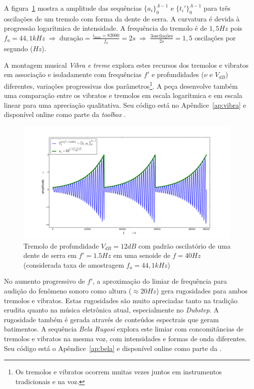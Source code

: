 A figura~\ref{fig:tremolo} mostra a amplitude das sequências $\{a_i\}_0^{\Lambda-1}$ e $\{t_i'\}_0^{\Lambda-1}$
para três oscilações de um tremolo com forma da dente de serra. A curvatura é devida à progressão logarítmica de
intensidade. A frequência do tremolo é de $1,5Hz$ pois $f_a=44,1kHz \; \Rightarrow \; \text{duração} = \frac{i_{\text{máx}}=82000}{f_a}= 2s \; \Rightarrow \; \frac{3\text{oscilações}}{2s}=1,5$ oscilações por segundo ($Hz$). 

A montagem musical \emph{Vibra e treme} explora estes recursos dos tremolos e vibratos em associação e isoladamente
com frequências $f'$
e profundidades ($\nu$ e $V_{dB}$) diferentes, variações progressivas dos parâmetros\footnote{Os tremolos e vibratos ocorrem muitas vezes juntos em instrumentos tradicionais e na voz.}. A peça desenvolve também uma comparação entre os vibratos e tremolos em escala logarítmica e em escala linear para uma apreciação qualitativa. Seu código está no Apêndice~\ref{ap:vibra} e disponível online como parte da \emph{toolbox} \massa.


\begin{figure}[h!]
    \centering
        \includegraphics[width=\textwidth]{figuras/tremolo}
    \caption{Tremolo de profundidade $V_{dB}=12dB$ com padrão oscilatório de uma dente de serra em $f'=1.5Hz$ em uma senoide de $f=40Hz$ (considerada taxa de amostragem $f_a=44,1kHz$)}
        \label{fig:tremolo}
\end{figure}

No aumento progressivo de $f'$,
a aproximação do limiar de frequência
para audição do fenômeno sonoro como
altura ($\approx 20Hz$) gera rugosidades para
ambos tremolos e vibratos. Estas rugosidades são muito apreciadas
tanto na tradição erudita quanto na música eletrônica atual, especialmente no \emph{Dubstep}.\cite{DubRugoso}
A rugosidade também é gerada através de conteúdos espectrais que geram batimentos.\cite{Porres}  A sequência \emph{Bela Rugosi}
explora este limiar com concomitâncias de tremolos e vibratos na mesma
voz, com intensidades e formas de onda diferentes. Seu código está o Apêndice~\ref{ap:bela} e disponível online como parte da \massa.

